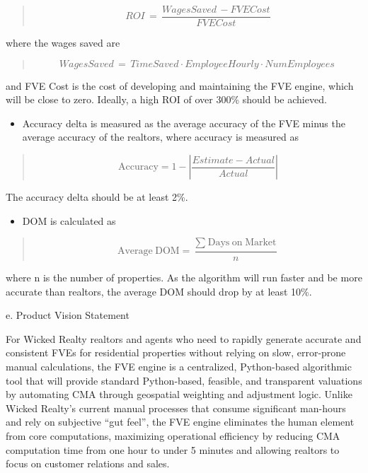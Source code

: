 \documentclass[
]{article}
\begin{document}
\begin{quote}
\[ROI\, = \,\frac{WagesSaved\, - FVECost}{FVECost}\]
\end{quote}

where the wages saved are

\begin{quote}
\[WagesSaved\, = \, TimeSaved \cdot EmployeeHourly \cdot NumEmployees\ \]
\end{quote}

and FVE Cost is the cost of developing and maintaining the FVE engine,
which will be close to zero. Ideally, a high ROI of over 300\% should be
achieved.

\begin{itemize}
\item
  Accuracy delta is measured as the average accuracy of the FVE minus
  the average accuracy of the realtors, where accuracy is measured as
\end{itemize}

\begin{quote}
\[\text{Accuracy} = 1 - \left| \frac{Estimate - Actual}{Actual} \right|\]
\end{quote}

The accuracy delta should be at least 2\%.

\begin{itemize}
\item
  DOM is calculated as
\end{itemize}

\begin{quote}
\[\text{Average}\text{ }\text{DOM} = \frac{\sum_{\text{ }}^{\text{ }}\text{Days}\text{ }\text{on}\text{ }\text{Market}}{n}\]
\end{quote}

where n is the number of properties. As the algorithm will run faster
and be more accurate than realtors, the average DOM should drop by at
least 10\%.

e. Product Vision Statement

For Wicked Realty realtors and agents who need to rapidly generate
accurate and consistent FVEs for residential properties without relying
on slow, error-prone manual calculations, the FVE engine is a
centralized, Python-based algorithmic tool that will provide standard
Python-based, feasible, and transparent valuations by automating CMA
through geospatial weighting and adjustment logic. Unlike Wicked
Realty's current manual processes that consume significant man-hours and
rely on subjective ``gut feel'', the FVE engine eliminates the human
element from core computations, maximizing operational efficiency by
reducing CMA computation time from one hour to under 5 minutes and
allowing realtors to focus on customer relations and sales.
\end{document}
